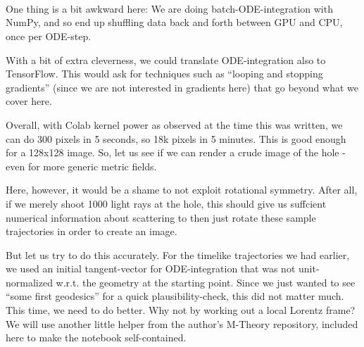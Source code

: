 \documentclass[11pt]{article}
\begin{document}
    \begin{center}
    \end{center}
    { \hspace*{\fill} \\}
    
    \begin{center}
    \end{center}
    { \hspace*{\fill} \\}
    
    \begin{center}
    \end{center}
    { \hspace*{\fill} \\}
    
    One thing is a bit awkward here: We are doing batch-ODE-integration with
NumPy, and so end up shuffling data back and forth between GPU and CPU,
once per ODE-step.

With a bit of extra cleverness, we could translate ODE-integration also
to TensorFlow. This would ask for techniques such as ``looping and
stopping gradients'' (since we are not interested in gradients here)
that go beyond what we cover here.

Overall, with Colab kernel power as observed at the time this was
written, we can do 300 pixels in 5 seconds, so 18k pixels in 5 minutes.
This is good enough for a 128x128 image. So, let us see if we can render
a crude image of the hole - even for more generic metric fields.

Here, however, it would be a shame to not exploit rotational symmetry.
After all, if we merely shoot 1000 light rays at the hole, this should
give us suffcient numerical information about scattering to then just
rotate these sample trajectories in order to create an image.

But let us try to do this accurately. For the timelike trajectories we
had earlier, we used an initial tangent-vector for ODE-integration that
was not unit-normalized w.r.t. the geometry at the starting point. Since
we just wanted to see ``some first geodesics'' for a quick
plausibility-check, this did not matter much. This time, we need to do
better. Why not by working out a local Lorentz frame? We will use
another little helper from the author's M-Theory repository, included
here to make the notebook self-contained.
\end{document}
